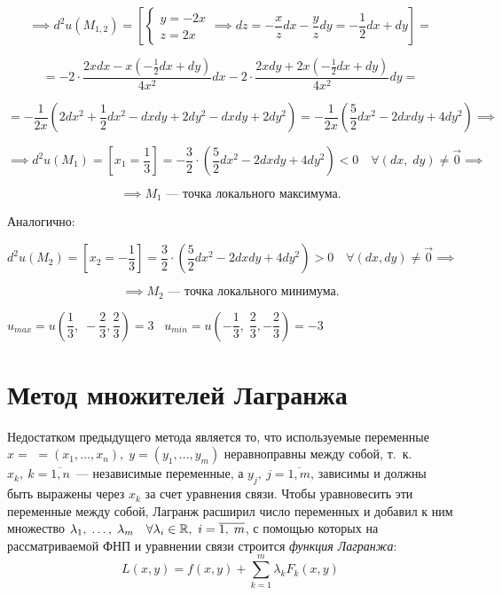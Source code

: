 \documentclass[../../main.tex]{subfiles}
\begin{document}
\begin{example}
	\[\implies d^2u\left(M_{1, 2}\right) = \left[
	\begin{cases}
	y = -2x\\
	z = 2x 
	\end{cases} \implies dz = -\dfrac{x}{z}dx - \dfrac{y}{z}dy = 
	-\dfrac{1}{2}dx + dy 
	\right] =\]
	
	\[= -2 \cdot \frac{2xdx - x\left(-\frac{1}{2}dx + dy\right)}{4x^2}dx - 
	2 \cdot \frac{2xdy + 2x \left(-\frac{1}{2}dx + dy\right)}{4x^2}dy =\]
	
	\[= -\dfrac{1}{2x}\left(2dx^2 + \dfrac{1}{2}dx^2 - dxdy + 2dy^2 - 
	dxdy + 2dy^2 \right) = -\dfrac{1}{2x} \left( \dfrac{5}
	{2} dx^2 - 2dxdy + 4dy^2 \right) \implies\]
	
	\[\implies d^2u\left(M_1\right) = \left[x_1 = \dfrac{1}{3}\right] = 
	-\dfrac{3}{2}\cdot\left(\dfrac{5}{2}dx^2 - 2dxdy + 
	4dy^2\right) < 0 \quad 
	\forall \left(dx, \; dy\right) \neq \vec{0} \implies\]
	
	\[\implies M_1 \text{~--- точка локального максимума}.\]
	
	Аналогично:
	
	\[d^2u \left(M_2\right) = \left[x_2 = -\dfrac{1}{3} \right] = 
	\dfrac{3}{2} \cdot \left( \dfrac{5}{2} dx^2 - 2dxdy + 4dy^2\right) > 0 
	\quad \forall \left(dx, dy\right) \neq \vec{0} \implies\]
	
	\[ \implies M_2 
	\text{~--- точка локального минимума}.\]
	
	$u_{max} = u\left(\dfrac{1}{3}, \; -\dfrac{2}{3}, 
	\dfrac{2}{3}\right) = 3 \;\;\; 
	u_{min} = u\left(-\dfrac{1}{3}, \; 
	\dfrac{2}{3}, -\dfrac{2}{3}\right) = -3$ 
\end{example}

	\section{Метод множителей Лагранжа} 
	
	Недостатком предыдущего метода является то, что используемые переменные 
	$x = $ $=\left(x_1, \ldots, x_n\right), \; y = \left(y_1,\ldots, y_m\right)$
	неравноправны между собой, т.~к. $x_k,\ k = \overline{1, n}$~--- 
	независимые переменные, а $y_j,\ j = \overline{1, m}$, зависимы и 
	должны быть выражены через $x_k$ за счет уравнения связи. 
	Чтобы уравновесить эти переменные между собой, Лагранж расширил 
	число переменных и добавил к ним множество 
	$\lambda_1,\; \ldots,\; \lambda_m\quad \forall 
	\lambda_i \in \mathbb{R},\ i = \overline{1,\; m}$, 
	с помощью которых на рассматриваемой ФНП и уравнении 
	связи строится \emph{функция Лагранжа}:
	\begin{equation}
	L\left(x, y\right) = f\left(x, y\right) + \sum\limits_{k = 1}^m 
	\lambda_k F_k\left(x, y\right) \label{lec11.1:8}
	\end{equation}
	
\end{document}
